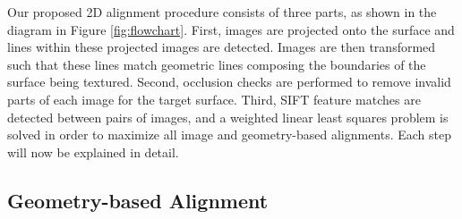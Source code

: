 \documentclass{llncs}
\begin{document}


Our proposed 2D alignment procedure consists of three parts, as shown
in the diagram in Figure \ref{fig:flowchart}. First, images are
projected onto the surface and lines within these projected images are
detected. Images are then transformed such that these lines match
geometric lines composing the boundaries of the surface being
textured. Second, occlusion checks are performed to remove invalid
parts of each image for the target surface. Third, SIFT feature
matches are detected between pairs of images, and a weighted linear
least squares problem is solved in order to maximize all image and
geometry-based alignments. Each step will now be explained in detail.


\subsection{Geometry-based Alignment}
\label{sec:geometryAlignment}
\end{document}
